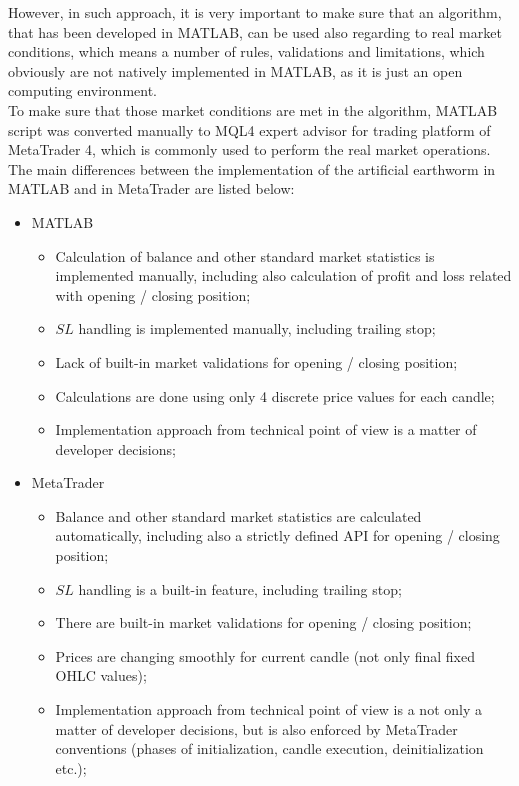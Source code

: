 \documentclass[runningheads,a4paper]{llncs}
\begin{document}
However, in such approach, it is very important to make sure that an algorithm, that has been developed in MATLAB, can be used also regarding to real market conditions, which means a number of rules, validations and limitations, which obviously are not natively implemented in MATLAB, as it is just an open computing environment.\\

To make sure that those market conditions are met in the algorithm, MATLAB script was converted manually to MQL4 expert advisor for trading platform of MetaTrader 4, which is commonly used to perform the real market operations.\\

The main differences between the implementation of the artificial earthworm in MATLAB and in MetaTrader are listed below:
\begin{itemize}
\item MATLAB
\begin{itemize}
\item Calculation of balance and other standard market statistics is implemented manually, including also calculation of profit and loss related with opening / closing position;
\item $SL$ handling is implemented manually, including trailing stop;
\item Lack of built-in market validations for opening / closing position;
\item Calculations are done using only 4 discrete price values for each candle;
\item Implementation approach from technical point of view is a matter of developer decisions;
\end{itemize}
\item MetaTrader
\begin{itemize}
\item Balance and other standard market statistics are calculated automatically, including also a strictly defined API for opening / closing position;
\item $SL$ handling is a built-in feature, including trailing stop;
\item There are built-in market validations for opening / closing position;
\item Prices are changing smoothly for current candle (not only final fixed OHLC values);
\item Implementation approach from technical point of view is a not only a matter of developer decisions, but is also enforced by MetaTrader conventions (phases of initialization, candle execution, deinitialization etc.);
\end{itemize}
\end{itemize}
\end{document}

